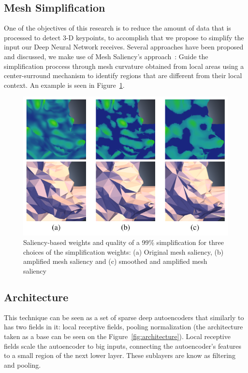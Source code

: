 \documentclass{comjnl}
\begin{document}
\subsection{Mesh Simplification}
One of the objectives of this research is to reduce the amount of data
that is processed to detect 3-D keypoints, to accomplish that we propose 
to simplify the input our Deep Neural Network receives. Several approaches
have been proposed and discussed, we make use of Mesh Saliency's
approach~\cite{Lee2005}: Guide the simplification proccess through mesh
curvature obtained from local areas using a center-surround mechanism
to identify regions that are different from their local context. An example
is seen in Figure~\ref{fig:simplification}.

\begin{figure}
\centering
\includegraphics[width=1\linewidth]{figures/mesh_simplification.png}
\caption{Saliency-based weights and quality of a 99\% simplification
for three choices of the simplification weights: (a) Original mesh saliency,
(b) amplified mesh saliency and (c) smoothed and amplified mesh saliency~\cite{Lee2005}}
\label{fig:simplification}
\end{figure}  

\subsection{Architecture}
This technique can be seen as a set of sparse deep autoencoders that
similarly to~\cite{Le2013} has two fields in it: local receptive fields,
pooling normalization (the architecture taken as a base can be seen
on the Figure~\ref{fig:architecture}). Local receptive fields scale the
autoencoder to big inputs, connecting the autoencoder's features to a small
region of the next lower layer. These sublayers are know as filtering and
pooling.
\end{document}
